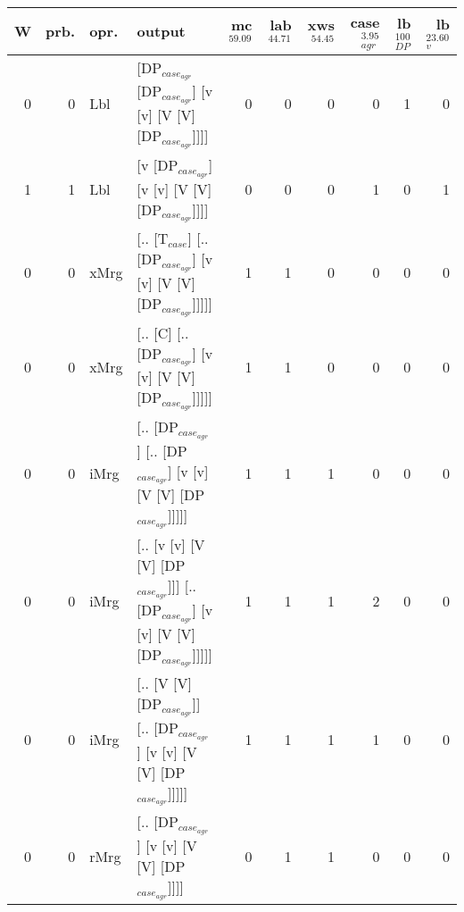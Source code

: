 \begin{tabularx}{\linewidth}{rrlXrrrrrr}
\hline
   W &   prb. & opr.   & output                                                                              &   mc$^{59.09}$ &   lab$^{44.71}$ &   xws$^{54.45}$ &   case$_{agr}^{3.95}$ &   lb$_{DP}^{100}$ &   lb$_{v}^{23.60}$ \\
\hline
   0 &   0 & Lbl  & [DP$_{case_{agr}}$ [DP$_{case_{agr}}$] [v [v] [V [V] [DP$_{case_{agr}}$]]]]                           &            0 &             0 &             0 &                  0 &                1 &              0 \\
   1 &   1 & Lbl  & [v [DP$_{case_{agr}}$] [v [v] [V [V] [DP$_{case_{agr}}$]]]]                                     &            0 &             0 &             0 &                  1 &                0 &              1 \\
   0 &   0 & xMrg & [.. [T$_{case}$] [.. [DP$_{case_{agr}}$] [v [v] [V [V] [DP$_{case_{agr}}$]]]]]                      &            1 &             1 &             0 &                  0 &                0 &              0 \\
   0 &   0 & xMrg & [.. [C] [.. [DP$_{case_{agr}}$] [v [v] [V [V] [DP$_{case_{agr}}$]]]]]                           &            1 &             1 &             0 &                  0 &                0 &              0 \\
   0 &   0 & iMrg & [.. [DP$_{case_{agr}}$] [.. [DP$_{case_{agr}}$] [v [v] [V [V] [DP$_{case_{agr}}$]]]]]                 &            1 &             1 &             1 &                  0 &                0 &              0 \\
   0 &   0 & iMrg & [.. [v [v] [V [V] [DP$_{case_{agr}}$]]] [.. [DP$_{case_{agr}}$] [v [v] [V [V] [DP$_{case_{agr}}$]]]]] &            1 &             1 &             1 &                  2 &                0 &              0 \\
   0 &   0 & iMrg & [.. [V [V] [DP$_{case_{agr}}$]] [.. [DP$_{case_{agr}}$] [v [v] [V [V] [DP$_{case_{agr}}$]]]]]         &            1 &             1 &             1 &                  1 &                0 &              0 \\
   0 &   0 & rMrg & [.. [DP$_{case_{agr}}$] [v [v] [V [V] [DP$_{case_{agr}}$]]]]                                    &            0 &             1 &             1 &                  0 &                0 &              0 \\
\hline
\end{tabularx}\endgroup\\

